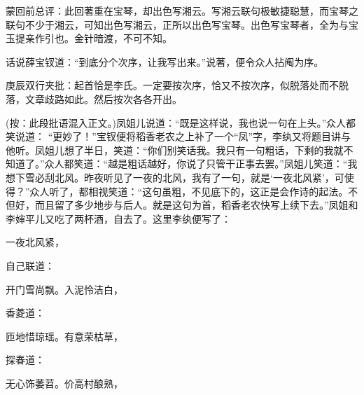 \begin{parag}
    \begin{note}蒙回前总评：此回著重在宝琴，却出色写湘云。写湘云联句极敏捷聪慧，而宝琴之联句不少于湘云，可知出色写湘云，正所以出色写宝琴。出色写宝琴者，全为与宝玉提亲作引也。金针暗渡，不可不知。\end{note}
\end{parag}


\begin{parag}
    话说薛宝钗道：“到底分个次序，让我写出来。”说著，便令众人拈阄为序。\begin{note}庚辰双行夹批：起首恰是李氏。一定要按次序，恰又不按次序，似脱落处而不脱落，文章歧路如此。然后按次各各开出。\end{note}(按：此段批语混入正文。)凤姐儿说道：“既是这样说，我也说一句在上头。”众人都笑说道： “更妙了！”宝钗便将稻香老农之上补了一个“凤”字，李纨又将题目讲与他听。凤姐儿想了半日，笑道：“你们别笑话我。我只有一句粗话，下剩的我就不知道了。”众人都笑道：“越是粗话越好，你说了只管干正事去罢。”凤姐儿笑道：“我想下雪必刮北风。昨夜听见了一夜的北风，我有了一句，就是‘一夜北风紧’，可使得？”众人听了，都相视笑道：“这句虽粗，不见底下的，这正是会作诗的起法。不但好，而且留了多少地步与后人。就是这句为首，稻香老农快写上续下去。”凤姐和李婶平儿又吃了两杯酒，自去了。这里李纨便写了：
\end{parag}
\begin{poem}
    \begin{pl} 一夜北风紧，\end{pl}
\end{poem}


\begin{parag}
    自己联道：
\end{parag}
\begin{poem}
    \begin{pl} 开门雪尚飘。入泥怜洁白，\end{pl}
\end{poem}


\begin{parag}
    香菱道：
\end{parag}
\begin{poem}
    \begin{pl} 匝地惜琼瑶。有意荣枯草，\end{pl}
\end{poem}


\begin{parag}
    探春道：
\end{parag}
\begin{poem}
    \begin{pl} 无心饰萎苕。价高村酿熟，\end{pl}
\end{poem}


